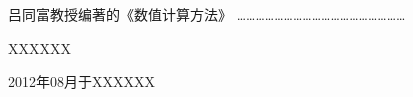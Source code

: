  \vspace*{0.0cm}
\thispagestyle{empty}
\vspace*{2.2cm}
\centerline{\hei{\color{darkblue}{第二版序}}}\vspace{2cm}

吕同富教授编著的《数值计算方法》
………………………………………………


\vspace{2cm}

\hfill XXXXXX\hspace{0.2em}

\hfill 2012年08月于XXXXXX\hspace{0.2em}
